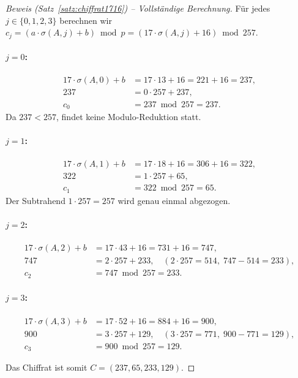 ﻿\documentclass[a4paper,12pt]{scrreprt}
\theoremstyle{definition}
\begin{document}
\begin{proof}[Beweis (Satz~\ref{satz:chiffrat1716}) -- Vollständige Berechnung]
Für jedes $j \in \{0,1,2,3\}$ berechnen wir $c_j = (a \cdot \sigma(A,j) + b) \bmod p = (17 \cdot \sigma(A,j) + 16) \bmod 257$.

\paragraph{$j = 0$:}
\begin{align*}
17 \cdot \sigma(A,0) + b &= 17 \cdot 13 + 16 = 221 + 16 = 237, \\
237 &= 0 \cdot 257 + 237, \\
c_0 &= 237 \bmod 257 = 237.
\end{align*}
Da $237 < 257$, findet keine Modulo-Reduktion statt.

\paragraph{$j = 1$:}
\begin{align*}
17 \cdot \sigma(A,1) + b &= 17 \cdot 18 + 16 = 306 + 16 = 322, \\
322 &= 1 \cdot 257 + 65, \\
c_1 &= 322 \bmod 257 = 65.
\end{align*}
Der Subtrahend $1 \cdot 257 = 257$ wird genau einmal abgezogen.

\paragraph{$j = 2$:}
\begin{align*}
17 \cdot \sigma(A,2) + b &= 17 \cdot 43 + 16 = 731 + 16 = 747, \\
747 &= 2 \cdot 257 + 233, \quad (2 \cdot 257 = 514,\; 747 - 514 = 233), \\
c_2 &= 747 \bmod 257 = 233.
\end{align*}

\paragraph{$j = 3$:}
\begin{align*}
17 \cdot \sigma(A,3) + b &= 17 \cdot 52 + 16 = 884 + 16 = 900, \\
900 &= 3 \cdot 257 + 129, \quad (3 \cdot 257 = 771,\; 900 - 771 = 129), \\
c_3 &= 900 \bmod 257 = 129.
\end{align*}

Das Chiffrat ist somit $C = (237, 65, 233, 129)$.
\end{proof}
\end{document}
